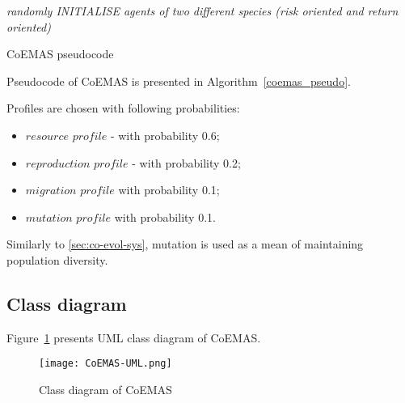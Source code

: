 \begin{algorithm}
 
  \BlankLine
  \emph{randomly INITIALISE agents of two different species (risk oriented and return oriented)}\;
  \caption{CoEMAS pseudocode}\label{coemas_pseudo}
\end{algorithm}

Pseudocode of CoEMAS is presented in Algorithm~\ref{coemas_pseudo}.

Profiles are chosen with following probabilities:
\begin{itemize}
  \item $resource$ $profile$ - with probability 0.6;
  \item $reproduction$ $profile$ - with probability 0.2;
  \item $migration$ $profile$ with probability 0.1;
  \item $mutation$ $profile$ with probability 0.1.
\end{itemize}

Similarly to \ref{sec:co-evol-sys}, mutation is used as a mean of maintaining population diversity.


\subsection{Class diagram}
\label{CoEMAS-class-diagram}

Figure~\ref{fig:coemas-uml} presents UML class diagram of CoEMAS.

\begin{figure}[ht]   
	    \begin{center}
	      \texttt{[image: CoEMAS-UML.png]}
	    \end{center}
	    \caption{Class diagram of CoEMAS} 
	    \label{fig:coemas-uml}
	  \end{figure}

